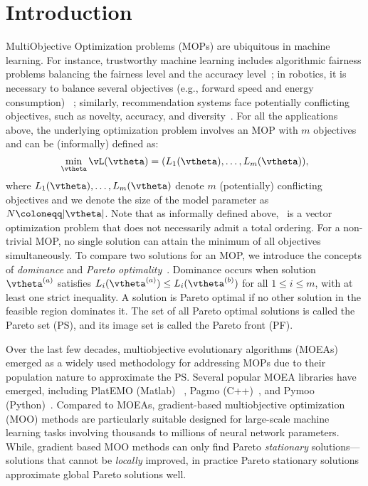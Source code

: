 \section{Introduction}
MultiObjective Optimization problems (MOPs) are ubiquitous in machine learning. For instance, trustworthy machine learning includes algorithmic fairness problems balancing the fairness level and the accuracy level~\cite{zhao2022inherent,xian2023fair}; 
in robotics, it is necessary to balance several objectives (e.g., forward speed and energy consumption) ~\cite{brandao2019multi, xu2020prediction}; similarly, recommendation systems face potentially conflicting objectives, such as novelty, accuracy, and diversity~\cite{jannach2022multi,keat9791369,zaizi2023102233}.
For all the applications above, the underlying optimization problem involves an MOP with \( m \) objectives and can be (informally) defined as:
\begin{equation}
    \min_\vtheta \vL(\vtheta) = ( L_1(\vtheta), \ldots, L_m(\vtheta) ),
    \label{eqn:mop}
\end{equation}
where \( L_1(\vtheta), \ldots, L_m(\vtheta) \) denote \( m \) (potentially) conflicting objectives and we denote the size of the model parameter as \(N \coloneqq |\vtheta| \). Note that as informally defined above,~ is a vector optimization problem that does not necessarily admit a total ordering.
For a non-trivial MOP, no single solution can attain the minimum of all objectives simultaneously. To compare two solutions for an MOP, we introduce the concepts of \emph{dominance} and \emph{Pareto optimality}~\cite{ehrgott2005multicriteria}. 
Dominance occurs when solution \( \vtheta^{(a)} \) satisfies \( L_i(\vtheta^{(a)}) \leq L_i(\vtheta^{(b)}) \) for all \( 1 \leq i \leq m \), with at least one strict inequality.
A solution is Pareto optimal if no other solution in the feasible region dominates it. The set of all Pareto optimal solutions is called the Pareto set (PS), and its image set is called the Pareto front (PF).

Over the last few decades, multiobjective evolutionary algorithms (MOEAs) emerged as a widely used methodology for addressing MOPs due to their population nature to approximate the PS. Several popular MOEA libraries have emerged, including PlatEMO (Matlab) ~\cite{tian2017platemo}, Pagmo (C++)~\cite{Biscani2020}, and Pymoo (Python)~\cite{blank2020generating}. Compared to MOEAs, gradient-based multiobjective optimization (MOO) methods are particularly suitable designed for large-scale machine learning tasks involving thousands to millions of neural network parameters. While, gradient based MOO methods can only find Pareto \emph{stationary} solutions—solutions that cannot be \emph{locally} improved, in practice Pareto stationary solutions approximate global Pareto solutions well.

